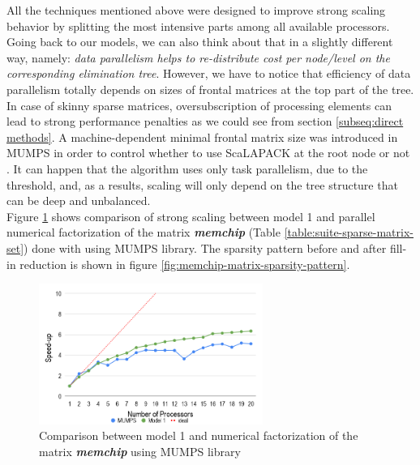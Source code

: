 All the techniques mentioned above were designed to improve strong scaling behavior by splitting the most intensive parts among all available processors. Going back to our models, we can also think about that in a slightly different way, namely: \textit{data parallelism helps to re-distribute cost per node/level on the corresponding elimination tree}. However, we have to notice that efficiency of data parallelism totally depends on sizes of frontal matrices at the top part of the tree. In case of skinny sparse matrices, oversubscription of processing elements can lead to strong performance penalties as we could see from section \ref{subseq:direct methods}. A machine-dependent minimal frontal matrix size was introduced in MUMPS in order to control whether to use ScaLAPACK at the root node or not \cite{mumps-manual}. It can happen that the algorithm uses only task parallelism, due to the threshold, and, as a results, scaling will only depend on the tree structure that can be deep and unbalanced.\\


Figure \ref{fig:model-1-vs-mumps} shows comparison of strong scaling between model 1 and parallel numerical factorization of the matrix \textit{\textbf{memchip}} (Table \ref{table:suite-sparse-matrix-set}) done with using MUMPS library. The sparsity pattern before and after fill-in reduction is shown in figure \ref{fig:memchip-matrix-sparsity-pattern}. 

\begin{figure}[htpb]
  \centering
  \includegraphics[width=0.65\textwidth]{figures/chapter-2/model-1-vs-mumps.png}
\caption{Comparison between model 1 and numerical factorization of the matrix \textit{\textbf{memchip}} using MUMPS library}
\label{fig:model-1-vs-mumps}
\end{figure}


